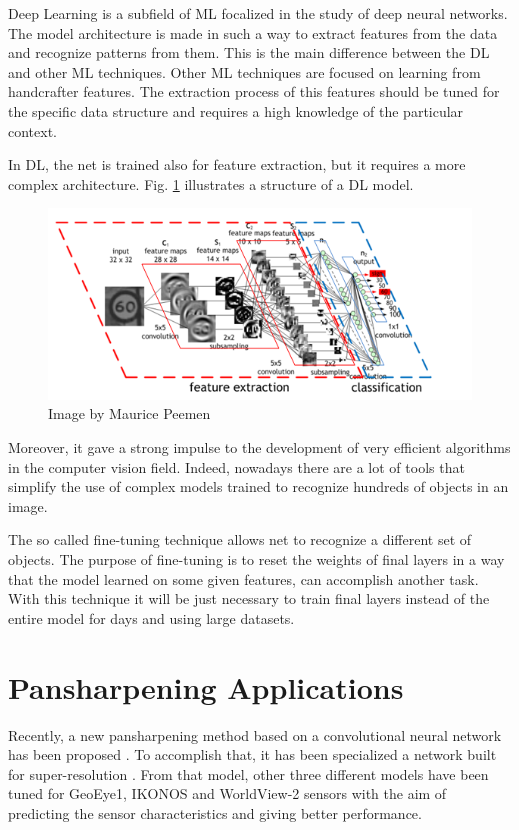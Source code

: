 \documentclass[12pt]{report}
\begin{document}
Deep Learning \cite{deeplearning} is a subfield of ML focalized in the study of deep neural networks.
The model architecture is made in such a way to extract features from the data and recognize patterns from them.
This is the main difference between the DL and other ML techniques.
Other ML techniques are focused on learning from handcrafter features.
The extraction process of this features should be tuned for the specific data structure and 
requires a high knowledge of the particular context.

In DL, the net is trained also for feature extraction, but it requires a more complex architecture.
Fig. \ref{fig:dl-architecture} illustrates a structure of a DL model. 

\begin{figure}[t]
    \centering
    \includegraphics[scale=1.2]{dlarchitecture.png}
    \caption{Image by Maurice Peemen}
    \label{fig:dl-architecture}
\end{figure}

Moreover, it gave a strong impulse to the development of very efficient algorithms in the computer vision field. 
Indeed, nowadays there are a lot of tools that simplify the use of complex models trained to 
recognize hundreds of objects in an image. 

The so called fine-tuning technique allows net to recognize a different set of objects.
The purpose of fine-tuning is to reset the weights of final layers in a way that the model learned on some given features, can accomplish another task.
With this technique it will be just necessary to train final layers instead of the entire model for days and using large datasets.


\section{Pansharpening Applications}

Recently, a new pansharpening method based on a convolutional neural network has been proposed \cite{pnn}.
To accomplish that, it has been specialized a network built for super-resolution \cite{superesolution}.
From that model, other three different models have been tuned for GeoEye1, IKONOS and WorldView-2 sensors
with the aim of predicting the sensor characteristics and giving better performance. 
\end{document}
